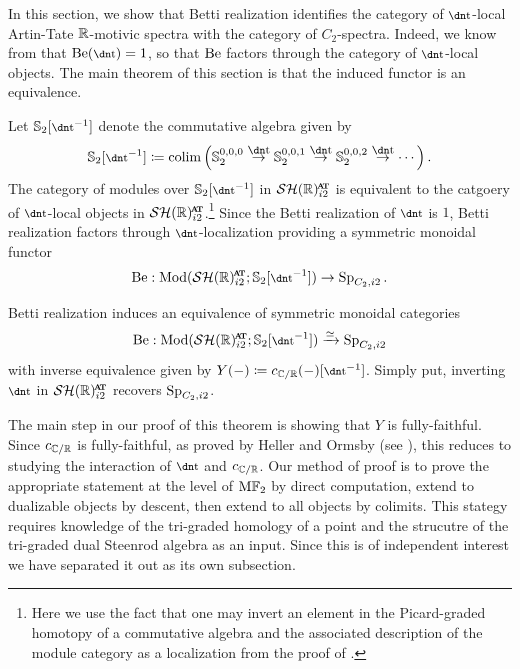 In this section, we show that Betti realization identifies the category of $\ta$-local Artin-Tate $\mathbb{R}$-motivic spectra with the category of $C_2$-spectra. Indeed, we know from  that $\b(\ta) = 1$, so that $\mathrm{Be}$ factors through the category of $\ta$-local objects. The main theorem of this section is that the induced functor is an equivalence.

\begin{dfn} \label{dfn:ta-inverted-betti}
  Let $\Ss_2[\ta^{-1}]$ denote the commutative algebra given by
  \[ \Ss_2 [\ta^{-1}] \coloneqq \colim\left( \Ss_2^{0,0,0} \stackrel{\ta}{\to} \Ss_2^{0,0,1} \stackrel{\ta}{\to} \Ss_2^{0,0,2} \stackrel{\ta}{\to} \cdots \right). \]
  The category of modules over $\Ss_2 [\ta^{-1}]$ in $\SHgc$ is equivalent to the catgoery of $\ta$-local objects in $\SHgc$.\footnote{Here we use the fact that one may invert an element in the Picard-graded homotopy of a commutative algebra and the associated description of the module category as a localization from the proof of \cite[Proposition 4.3.17]{ECII}.}
  Since the Betti realization of $\ta$ is $1$, Betti realization factors through $\ta$-localization providing a symmetric monoidal functor
  \[ \b : \Mod ( \SHgc ; \Ss_2 [\ta^{-1}] ) \to \Sp_{C_2, i2}. \]
\end{dfn}

\begin{thm} \label{thm:comparison-invert-ta}
  Betti realization induces an equivalence of symmetric monoidal categories
  \[ \b : \Mod ( \SHgc ; \Ss_2 [\ta^{-1}] ) \xrightarrow{\simeq} \Sp_{C_2, i2} \]
  with inverse equivalence given by $Y(-) \coloneqq c_{\C/\R}(-)[\ta^{-1}]$.
  Simply put, inverting $\ta$ in $\SHgc$ recovers $\operatorname{\mathrm{Sp}}_{C_2, i2}$. 
\end{thm}

The main step in our proof of this theorem is showing that $Y$ is fully-faithful.
Since $c_{\mathbb{C}/\mathbb{R}}$ is fully-faithful, as proved by Heller and Ormsby (see ), this reduces to studying the interaction of $\ta$ and $c_{\mathbb{C}/\mathbb{R}}$. Our method of proof is to prove the appropriate statement at the level of $\mathrm{M}\mathbb{F}_2$ by direct computation, extend to dualizable objects by descent, then extend to all objects by colimits. This stategy requires knowledge of the tri-graded homology of a point and the strucutre of the tri-graded dual Steenrod algebra as an input. Since this is of independent interest we have separated it out as its own subsection. 

